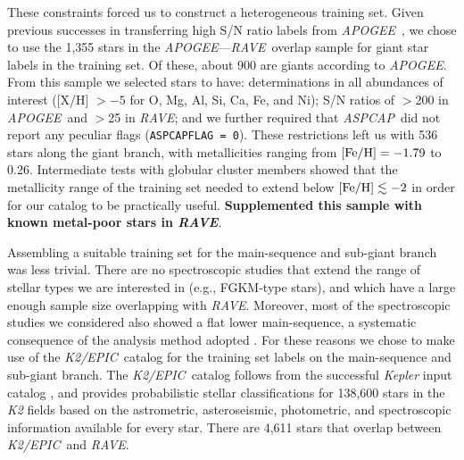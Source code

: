 \documentclass[preprint,trackchanges]{aastex}
\newcommand{\acronym}[1]{{\small{#1}}}
\newcommand{\project}[1]{\textsl{#1}}
\newcommand{\rave}{\project{\acronym{RAVE}}}
\newcommand{\apogee}{\project{\acronym{APOGEE}}}
\newcommand{\aspcap}{\project{\acronym{ASPCAP}}}
\newcommand{\epic}{\project{K2/EPIC}}
\newcommand{\stub}[1]{{\color{blue} \textbf{#1}}}
\begin{document}
These constraints forced us to construct a heterogeneous training set.  Given previous
successes in transferring high S/N ratio labels from \apogee\ \citep{Ness_2015,
Ness_2016,Ho_2016,Casey_2016b}, we chose to use the 1,355 stars in the \apogee---\rave\ 
overlap sample for giant star labels in the training set.  Of these, about 900 are 
giants according to \apogee.  From this sample we selected stars to have: 
determinations in all abundances of interest ([X/H] $> -5$ for O, Mg, Al, Si, Ca, Fe, and Ni); S/N ratios of $>$200 in \apogee\ and $>$25 in \rave; and 
we further required that \aspcap\ did not report any peculiar flags 
(\texttt{ASPCAPFLAG = 0}).  These restrictions left us with 536 stars along the giant 
branch, with metallicities ranging from $[{\rm Fe/H}] = -1.79$ to 0.26.  Intermediate 
tests with globular cluster members showed that the metallicity range of the training 
set needed to extend below $[{\rm Fe/H}] \lesssim -2$ in order for our catalog to be 
practically useful.  \stub{Supplemented this sample with known metal-poor stars in \rave}.



Assembling a suitable training set for the main-sequence and sub-giant branch was less
trivial.  There are no spectroscopic studies that extend the range of stellar types we 
are interested in (e.g., FGKM-type stars), and which have a large enough sample size 
overlapping with \rave.  Moreover, most of the spectroscopic studies we considered also 
showed a flat lower main-sequence, a systematic consequence of the analysis method adopted 
\citep[see][for discussion on this issue]{Bensby_2014}.  For these reasons we chose to make 
use of the \epic\ catalog \citep{Huber_2016} for the training set labels on the 
main-sequence and sub-giant branch.  The \epic\ catalog follows from the successful
\project{Kepler} input catalog \citep{Brown_2011}, and provides probabilistic stellar 
classifications for 138,600 stars in the \project{K2} fields based on the 
astrometric, asteroseismic, photometric, and spectroscopic information available for
every star.  There are 4,611 stars that overlap between \epic\ and \rave.
\end{document}
